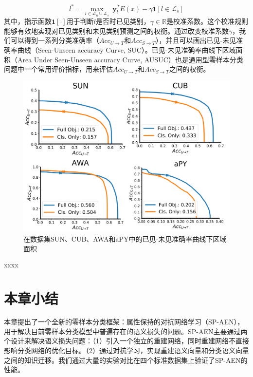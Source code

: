 \begin{equation}\label{ch3:eq:eq_8}
    l^* = \max_{l\in \mathcal{L}_u \cup \mathcal{L}_s }~\mathbf{y}^T_l E(x) - \gamma \mathbf{1} \left[ l \in \mathcal{L}_s \right]
\end{equation}
其中，指示函数$\mathbf{1} \left[ \cdot \right]$用于判断$l$是否时已见类别，$\gamma \in \mathbb{R}$是校准系数。这个校准规则能够有效地实现对已见类别和未见类别预测之间的权衡。通过改变校准系数$\gamma$，我们可以得到一系列分类准确率（$Acc_{U \to T}$和$Acc_{S \to T}$），并且可以画出已见-未见准确率曲线（Seen-Unseen accuracy Curve, SUC）。已见-未见准确率曲线下区域面积（Area Under Seen-Unseen accuracy Curve, AUSUC）也是通用型零样本分类问题中一个常用评价指标，用来评估$Acc_{U \to T}$和$Acc_{S \to T}$之间的权衡。

\begin{figure}[ht]
    \centering
    \includegraphics[width=0.7\linewidth]{chapter3/res/ausuc.pdf}
    \caption{在数据集SUN、CUB、AWA和aPY中的已见-未见准确率曲线下区域面积~\cite{chao2016empirical}}
\label{ch3:fig:ausuc}
\end{figure}


xxxx


\section{本章小结}

本章提出了一个全新的零样本分类框架：属性保持的对抗网络学习（SP-AEN），用于解决目前零样本分类模型中普遍存在的语义损失的问题。SP-AEN主要通过两个设计来解决语义损失问题：（1）引入一个独立的重建网络，同时重建网络不直接影响分类网络的优化目标。（2）通过对抗学习，实现重建语义向量和分类语义向量之间的知识迁移。我们通过大量的实验对比在四个标准数据集上验证了SP-AEN的性能。


